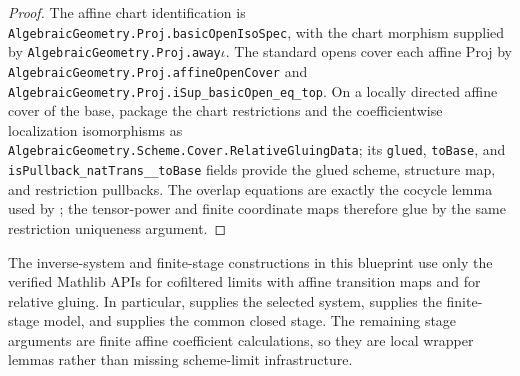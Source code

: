 \begin{proof}
  The affine chart identification is
  \texttt{AlgebraicGeometry.Proj.basicOpenIsoSpec}, with the chart morphism
  supplied by \texttt{AlgebraicGeometry.Proj.away\ensuremath{\iota}}.  The
  standard opens cover each affine Proj by
  \texttt{AlgebraicGeometry.Proj.affineOpenCover} and
  \texttt{AlgebraicGeometry.Proj.iSup\_basicOpen\_eq\_top}.  On a locally
  directed affine cover of the base, package the chart restrictions and the
  coefficientwise localization isomorphisms as
  \texttt{AlgebraicGeometry.Scheme.Cover.RelativeGluingData}; its
  \texttt{glued}, \texttt{toBase}, and
  \texttt{isPullback\_natTrans\_\iota\_toBase} fields provide the glued scheme,
  structure map, and restriction pullbacks.  The overlap equations are exactly
  the cocycle lemma used by
  ; the tensor-power and finite
  coordinate maps therefore glue by the same restriction uniqueness argument.
\end{proof}

\begin{lemma}
  \label{lemma:nagata-noetherian-current-api}

  The inverse-system and finite-stage constructions in this blueprint use only
  the verified Mathlib APIs for cofiltered limits with affine transition maps
  and for relative gluing.  In particular,
   supplies the selected system,
   supplies the finite-stage model,
  and  supplies the common
  closed stage.  The remaining stage arguments are finite affine coefficient
  calculations, so they are local wrapper lemmas rather than missing
  scheme-limit infrastructure.
\end{lemma}


